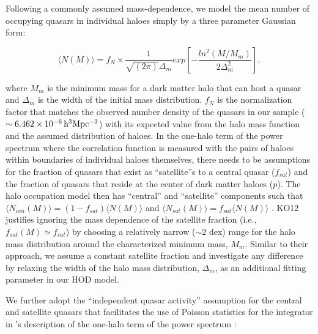 \documentclass[useAMS,usenatbib]{mn2e}
\begin{document}
Following a commonly assumed mass-dependence, we model the mean number of 
occupying quasars in individual haloes simply by a three parameter Gaussian 
form: 

\begin{equation}
\langle N(M) \rangle = f_{N} \times \frac{1}{\sqrt{\left(2\pi \right)}\Delta_m} exp[-\frac{ln^2(M/M_m)}{2\Delta^{2}_m}],
\end{equation}

where $M_m$ is the minimum mass for a dark matter halo that can host a quasar 
and $\Delta_m$ is the width of the initial mass distribution. $f_N$ is the 
normalization factor that matches the observed number density of the quasars in 
our sample ($\sim6.462 \times 10^{-6} \, \rm h^3 Mpc^{-3}$) with its expected 
value from the halo mass function and the assumed distribution of haloes.
In the one-halo term of the power spectrum where the correlation function is 
measured with the pairs of haloes within boundaries of individual haloes 
themselves, there needs to be assumptions for the fraction of quasars that exist 
as ``satellite''s to a central quasar ($f_{sat}$) and the fraction of quasars 
that reside at the center of dark matter haloes ($p$). 
The halo occupation model then has ``central'' and ``satellite'' components such 
that $\langle N_{cen}(M)\rangle = (1-f_{sat})\langle N(M)\rangle$ and $\langle 
N_{sat}(M)\rangle = f_{sat} \langle N(M)\rangle$ \citep{bw02,kra04, zh05}.
KO12 justifies ignoring the mass dependence of the satellite fraction 
(i.e., $f_{sat}(M) \simeq f_{sat}$) by choosing a relatively narrow ($\sim 2$ 
dex) range for the halo mass distribution around the characterized minimum mass, 
$M_m$. Similar to their approach, we assume a constant satellite fraction and 
investigate any difference by relaxing the width of the halo mass distribution, 
$\Delta_m$, as an additional fitting parameter in our HOD model. 

We further adopt the ``independent quasar activity'' assumption for the central 
and satellite quasars that facilitates the use of Poisson statistics for the 
integrator in \citep{sel00}'s description of the one-halo term of the power 
spectrum \citep{ko12}:
\end{document}
